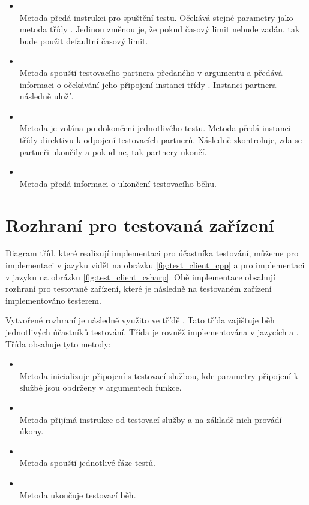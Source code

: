\begin{itemize}
    \item {} \\ Metoda předá instrukci pro spuštění testu. Očekává stejné parametry jako metoda  třídy . Jedinou změnou je, že pokud časový limit nebude zadán, tak bude použit defaultní časový limit.
    \item {} \\ Metoda spouští testovacího partnera předaného v argumentu a předává informaci o očekávání jeho připojení  instanci třídy . Instanci partnera následně uloží.
    \item {} \\ Metoda je volána po dokončení jednotlivého testu. Metoda předá instanci třídy  direktivu k odpojení testovacích partnerů. Následně zkontroluje, zda se partneři ukončily a pokud ne, tak partnery ukončí.
    \item {} \\ Metoda předá informaci o ukončení testovacího běhu.
\end{itemize}

\section{Rozhraní pro testovaná zařízení}\label{sec:testrunner}

Diagram tříd, které realizují implementaci pro účastníka testování, můžeme pro implementaci v jazyku \cpp{} vidět na obrázku \ref{fig:test_client_cpp} a pro implementaci v jazyku \csharp{} na obrázku \ref{fig:test_client_csharp}. Obě implementace obsahují rozhraní pro testované zařízení, které je následně na testovaném zařízení implementováno testerem.

Vytvořené rozhraní je následně využito ve třídě . Tato třída zajištuje běh jednotlivých účastníků testování. Třída je rovněž implementována v jazycích \csharp{} a \cpp{}. Třída obsahuje tyto metody: 

\begin{itemize}
    \item {} \\ Metoda inicializuje připojení s testovací službou, kde parametry připojení k službě jsou obdrženy v argumentech funkce.
    \item {} \\ Metoda přijímá instrukce od testovací služby a na základě nich provádí úkony.
    \item {} \\ Metoda spouští jednotlivé fáze testů. 
    \item {} \\ Metoda ukončuje testovací běh.
\end{itemize}

